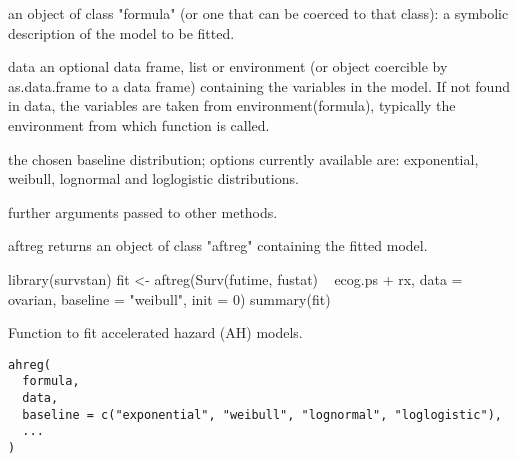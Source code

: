 \documentclass[letterpaper]{book}
\begin{document}
\begin{Arguments}
\begin{ldescription}
\item[\code{formula}] an object of class "formula" (or one that can be coerced to that class): a symbolic description of the model to be fitted.

\item[\code{data}] data an optional data frame, list or environment (or object coercible by as.data.frame to a data frame) containing the variables in the model. If not found in data, the variables are taken from environment(formula), typically the environment from which function is called.

\item[\code{baseline}] the chosen baseline distribution; options currently available are: exponential, weibull, lognormal and loglogistic distributions.

\item[\code{...}] further arguments passed to other methods.
\end{ldescription}
\end{Arguments}
%
\begin{Value}
aftreg returns an object of class "aftreg" containing the fitted model.
\end{Value}
%
\begin{Examples}
\begin{ExampleCode}

library(survstan)
fit <- aftreg(Surv(futime, fustat) ~ ecog.ps + rx, data = ovarian, baseline = "weibull", init = 0)
summary(fit)


\end{ExampleCode}
\end{Examples}
%
\begin{Description}\relax
Function to fit accelerated hazard (AH) models.
\end{Description}
%
\begin{Usage}
\begin{verbatim}
ahreg(
  formula,
  data,
  baseline = c("exponential", "weibull", "lognormal", "loglogistic"),
  ...
)
\end{verbatim}
\end{Usage}
%
\end{document}
